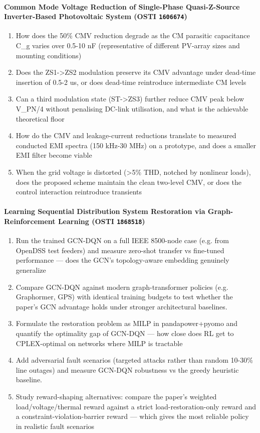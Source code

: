 \documentclass[11pt]{article}
\begin{document}
\paragraph{Common Mode Voltage Reduction of Single-Phase Quasi-Z-Source Inverter-Based Photovoltaic System \textnormal{\small(OSTI \texttt{1606674})}}
\begin{enumerate}[leftmargin=1.6em,itemsep=0.2em,topsep=0.2em,label=Q\arabic*.]
\item How does the 50\% CMV reduction degrade as the CM parasitic capacitance C\_g varies over 0.5-10 nF (representative of different PV-array sizes and mounting conditions)
\item Does the ZS1-\textgreater{}ZS2 modulation preserve its CMV advantage under dead-time insertion of 0.5-2 us, or does dead-time reintroduce intermediate CM levels
\item Can a third modulation state (ST-\textgreater{}ZS3) further reduce CMV peak below V\_PN/4 without penalising DC-link utilisation, and what is the achievable theoretical floor
\item How do the CMV and leakage-current reductions translate to measured conducted EMI spectra (150 kHz-30 MHz) on a prototype, and does a smaller EMI filter become viable
\item When the grid voltage is distorted (\textgreater{}5\% THD, notched by nonlinear loads), does the proposed scheme maintain the clean two-level CMV, or does the control interaction reintroduce transients
\end{enumerate}
\paragraph{Learning Sequential Distribution System Restoration via Graph-Reinforcement Learning \textnormal{\small(OSTI \texttt{1868518})}}
\begin{enumerate}[leftmargin=1.6em,itemsep=0.2em,topsep=0.2em,label=Q\arabic*.]
\item Run the trained GCN-DQN on a full IEEE 8500-node case (e.g. from OpenDSS test feeders) and measure zero-shot transfer vs fine-tuned performance --- does the GCN's topology-aware embedding genuinely generalize
\item Compare GCN-DQN against modern graph-transformer policies (e.g. Graphormer, GPS) with identical training budgets to test whether the paper's GCN advantage holds under stronger architectural baselines.
\item Formulate the restoration problem as MILP in pandapower+pyomo and quantify the optimality gap of GCN-DQN --- how close does RL get to CPLEX-optimal on networks where MILP is tractable
\item Add adversarial fault scenarios (targeted attacks rather than random 10-30\% line outages) and measure GCN-DQN robustness vs the greedy heuristic baseline.
\item Study reward-shaping alternatives: compare the paper's weighted load/voltage/thermal reward against a strict load-restoration-only reward and a constraint-violation-barrier reward --- which gives the most reliable policy in realistic fault scenarios
\end{enumerate}
\end{document}
